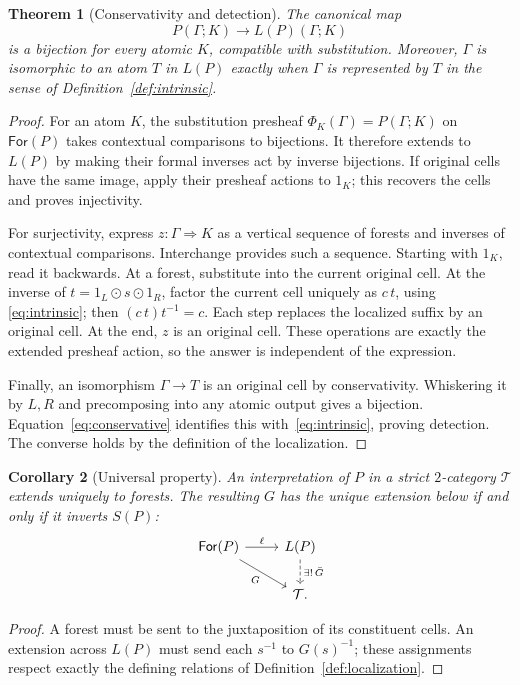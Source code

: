 \documentclass[11pt,a4paper]{article}
\newtheorem{theorem}{Theorem}[section]
\newtheorem{corollary}[theorem]{Corollary}
\theoremstyle{definition}
\theoremstyle{remark}
\numberwithin{equation}{section}
\newcommand{\cell}{\mathrel{\Longrightarrow}}
\newcommand{\wh}{\mathbin{\odot}}
\newcommand{\For}{\mathsf{For}}
\begin{document}
\begin{theorem}[Conservativity and detection]\label{thm:conservative}
The canonical map
\begin{equation}\label{eq:conservative}
P(\Gamma;K)\longrightarrow L(P)(\Gamma;K)
\end{equation}
is a bijection for every atomic $K$, compatible with substitution.
Moreover, $\Gamma$ is isomorphic to an atom $T$ in $L(P)$ exactly when
$\Gamma$ is represented by $T$ in the sense of
Definition~\ref{def:intrinsic}.
\end{theorem}
\begin{proof}
For an atom $K$, the substitution presheaf
$\Phi_K(\Gamma)=P(\Gamma;K)$ on $\For(P)$ takes contextual comparisons
to bijections. It therefore extends to $L(P)$ by making their formal
inverses act by inverse bijections. If original cells have the same image,
apply their presheaf actions to $1_K$; this recovers the cells and proves
injectivity.

For surjectivity, express $z:\Gamma\cell K$ as a vertical sequence of
forests and inverses of contextual comparisons. Interchange provides
such a sequence. Starting with $1_K$, read it backwards. At a forest,
substitute into the current original cell. At the inverse of
$t=1_L\wh s\wh1_R$, factor the current cell uniquely as $c\,t$, using
\eqref{eq:intrinsic}; then $(c\,t)t^{-1}=c$. Each step replaces the
localized suffix by an original cell. At the end, $z$ is an original
cell. These operations are exactly the extended presheaf action, so the
answer is independent of the expression.

Finally, an isomorphism $\Gamma\to T$ is an original cell by
conservativity. Whiskering it by $L,R$ and precomposing into any atomic
output gives a bijection. Equation~\eqref{eq:conservative} identifies this
with~\eqref{eq:intrinsic}, proving detection. The converse holds by the
definition of the localization.
\end{proof}

\begin{corollary}[Universal property]\label{cor:universal}
An interpretation of $P$ in a strict $2$-category $\mathcal T$ extends
uniquely to forests. The resulting $G$ has the unique extension below
if and only if it inverts $S(P)$:
\[
\begin{tikzcd}
\For(P) \arrow[r,"\ell"] \arrow[dr,"G"'] &
L(P) \arrow[d,dashed,"\exists!\,\bar G"]\\
& \mathcal T.
\end{tikzcd}
\]
\end{corollary}
\begin{proof}
A forest must be sent to the juxtaposition of its constituent cells.
An extension across $L(P)$ must send each $s^{-1}$ to $G(s)^{-1}$;
these assignments respect exactly the defining relations of
Definition~\ref{def:localization}.
\end{proof}
\end{document}
